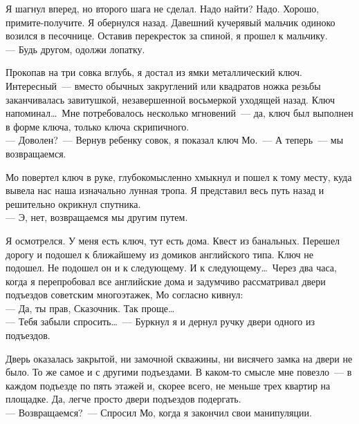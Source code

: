 Я шагнул вперед, но второго шага не сделал. Надо найти? Надо. Хорошо, 
примите-получите. Я обернулся назад. Давешний кучерявый мальчик одиноко возился 
в песочнице. Оставив перекресток за спиной, я прошел к мальчику.\\
--- Будь другом, одолжи лопатку.

Прокопав на три совка вглубь, я достал из ямки металлический ключ. 
Интересный~--- вместо обычных закруглений или квадратов ножка резьбы заканчивалась завитушкой, 
незавершенной восьмеркой уходящей назад. Ключ напоминал\ldots\ Мне 
потребовалось несколько мгновений~--- да, ключ был выполнен в форме ключа, только ключа 
скрипичного.\\
--- Доволен?~--- Вернув ребенку совок, я показал ключ Мо.~--- А теперь~--- мы 
возвращаемся.

Мо повертел ключ в руке, глубокомысленно хмыкнул и пошел к тому месту, куда 
вывела нас наша изначально лунная тропа. Я представил весь путь назад и 
решительно окрикнул спутника.\\
--- Э, нет, возвращаемся мы другим путем.

Я осмотрелся. У меня есть ключ, тут есть дома. Квест из банальных. Перешел 
дорогу и подошел к ближайшему из домиков английского типа. Ключ не подошел. Не 
подошел он и к следующему. И к следующему\ldots\ Через два часа, когда я 
перепробовал все английские дома и задумчиво рассматривал двери подъездов советским 
многоэтажек, Мо согласно кивнул:\\
--- Да, ты прав, Сказочник. Так проще\ldots\\
--- Тебя забыли спросить\ldots~--- Буркнул я и дернул ручку двери одного из 
подъездов. 

Дверь оказалась закрытой, ни замочной скважины, ни висячего замка на двери не 
было. То же самое и с другими подъездами. В каком-то смысле мне повезло~--- в 
каждом подъезде по пять этажей и, скорее всего, не меньше трех квартир на 
площадке. Да, легче просто двери подъездов подергать.\\
--- Возвращаемся?~--- Спросил Мо, когда я закончил свои манипуляции. 

